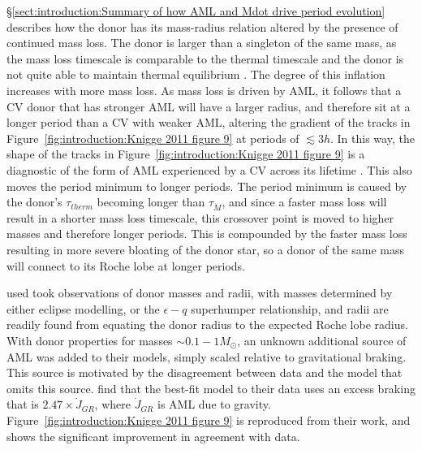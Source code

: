 \S\ref{sect:introduction:Summary of how AML and Mdot drive period evolution} describes how the donor has its mass-radius relation altered by the presence of continued mass loss. The donor is larger than a singleton of the same mass, as the mass loss timescale is comparable to the thermal timescale and the donor is not quite able to maintain thermal equilibrium \citep{knigge11}. The degree of this inflation increases with more mass loss. As mass loss is driven by AML, it follows that a CV donor that has stronger AML will have a larger radius, and therefore sit at a longer period than a CV with weaker AML, altering the gradient of the tracks in Figure~\ref{fig:introduction:Knigge 2011 figure 9} at periods of $\lesssim 3h$. In this way, the shape of the tracks in Figure~\ref{fig:introduction:Knigge 2011 figure 9} is a diagnostic of the form of AML experienced by a CV across its lifetime \citep{knigge11}.
This also moves the period minimum to longer periods. The period minimum is caused by the donor's $\tau_{therm}$ becoming longer than $\tau_{\dot M}$, and since a faster mass loss will result in a shorter mass loss timescale, this crossover point is moved to higher masses and therefore longer periods. This is compounded by the faster mass loss resulting in more severe bloating of the donor star, so a donor of the same mass will connect to its Roche lobe at longer periods. 

\citet{knigge11} used took observations of donor masses and radii, with masses determined by either eclipse modelling, or the $\epsilon - q$ superhumper relationship, and radii are readily found from equating the donor radius to the expected Roche lobe radius. 
With donor properties for masses $\sim 0.1 - 1 M_\odot$, an unknown additional source of AML was added to their models, simply scaled relative to gravitational braking. This source is motivated by the disagreement between data and the model that omits this source. \citet{knigge11} find that the best-fit model to their data uses an excess braking that is $2.47 \times \dot J_{GR}$, where $\dot J_{GR}$ is AML due to gravity. Figure~\ref{fig:introduction:Knigge 2011 figure 9} is reproduced from their work, and shows the significant improvement in agreement with data.

